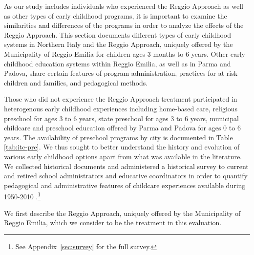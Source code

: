 
As our study includes individuals who experienced the Reggio Approach as well as other types of early childhood programs, it is important to examine the similarities and differences of the programs in order to analyze the effects of the Reggio Approach. This section documents different types of early childhood systems in Northern Italy and the Reggio Approach, uniquely offered by the Municipality of Reggio Emilia for children ages 3 months to 6 years. Other early childhood education systems within Reggio Emilia, as well as in Parma and Padova, share certain features of program administration, practices for at-risk children and families, and pedagogical methods. 

Those who did not experience the Reggio Approach treatment participated in heterogenous early childhood experiences including home-based care, religious preschool for ages 3 to 6 years, state preschool for ages 3 to 6 years, municipal childcare and preschool education offered by Parma and Padova for ages 0 to 6 years. The availability of preschool programs by city is documented in Table \ref{tab:itc-pre}. We thus sought to better understand the history and evolution of various early childhood options apart from what was available in the literature. We collected historical documents \citep{Padova-Admin-Data_1964-2011,Reggio-Admin-data_1966-2006,Reggio-Annual-Journals_1994-2011} and administered a historical survey to current and retired school administrators and educative coordinators in order to quantify pedagogical and administrative features of childcare experiences available during 1950-2010 \citep{CEHD_2016_Historical-Analysis}.\footnote{See Appendix~\ref{sec:survey} for the full survey.} 

We first describe the Reggio Approach, uniquely offered by the Municipality of Reggio Emilia, which we consider to be the treatment in this evaluation. 



